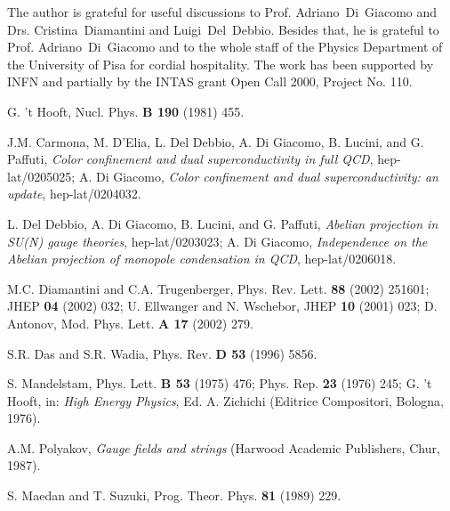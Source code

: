 \documentclass[a4paper,12pt]{article}
\begin{document}
The author is grateful for useful discussions to Prof. Adriano~Di~Giacomo and Drs. Cristina~Diamantini
and Luigi~Del~Debbio.
Besides that, he is grateful to
Prof. Adriano~Di~Giacomo and to the whole staff of the Physics Department of the
University of Pisa for cordial hospitality.
The work has been supported by INFN and partially by
the INTAS grant Open Call 2000, Project No. 110.







\newpage


\begin{thebibliography}{99}

G. 't Hooft, Nucl. Phys. {\bf B 190} (1981) 455.

J.M. Carmona, M. D'Elia, L. Del Debbio, A. Di Giacomo, B. Lucini, and G. Paffuti, {\it Color confinement
and dual superconductivity in full QCD}, hep-lat/0205025; A. Di Giacomo, {\it Color confinement and dual
superconductivity: an update}, hep-lat/0204032.

L. Del Debbio, A. Di Giacomo, B. Lucini, and G. Paffuti, {\it Abelian projection in SU(N) gauge theories},
hep-lat/0203023;
A. Di Giacomo, {\it Independence on the Abelian projection of monopole condensation in QCD}, hep-lat/0206018.

M.C. Diamantini and C.A. Trugenberger, Phys. Rev. Lett. {\bf 88} (2002) 251601; JHEP {\bf 04} (2002) 032;
U. Ellwanger and N. Wschebor, JHEP {\bf 10} (2001) 023; D. Antonov, Mod. Phys. Lett. {\bf A 17} (2002) 279.

S.R. Das and S.R. Wadia, Phys. Rev. {\bf D 53} (1996) 5856.

S. Mandelstam, Phys. Lett. {\bf B 53} (1975) 476; Phys. Rep.
{\bf 23} (1976) 245; G. 't Hooft, in: {\it High Energy Physics},
Ed. A. Zichichi (Editrice Compositori, Bologna, 1976).

A.M. Polyakov, {\it Gauge fields and strings} (Harwood Academic Publishers, Chur, 1987).

S. Maedan and T. Suzuki, Prog. Theor. Phys. {\bf 81} (1989) 229.


\end{thebibliography}
\end{document}
